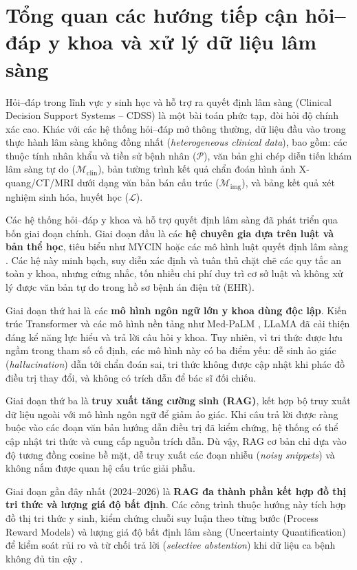 \section{Tổng quan các hướng tiếp cận hỏi--đáp y khoa và xử lý dữ liệu lâm sàng}

Hỏi--đáp trong lĩnh vực y sinh học và hỗ trợ ra quyết định lâm sàng (Clinical Decision Support Systems -- CDSS) là một bài toán phức tạp, đòi hỏi độ chính xác cao. Khác với các hệ thống hỏi--đáp mở thông thường, dữ liệu đầu vào trong thực hành lâm sàng không đồng nhất (\emph{heterogeneous clinical data}), bao gồm: các thuộc tính nhân khẩu và tiền sử bệnh nhân ($\mathcal{P}$), văn bản ghi chép diễn tiến khám lâm sàng tự do ($\mathcal{M}_{\mathrm{clin}}$), bản tường trình kết quả chẩn đoán hình ảnh X-quang/CT/MRI dưới dạng văn bản bán cấu trúc ($\mathcal{M}_{\mathrm{img}}$), và bảng kết quả xét nghiệm sinh hóa, huyết học ($\mathcal{L}$).

Các hệ thống hỏi--đáp y khoa và hỗ trợ quyết định lâm sàng đã phát triển qua bốn giai đoạn chính. Giai đoạn đầu là các \textbf{hệ chuyên gia dựa trên luật và bản thể học}, tiêu biểu như MYCIN hoặc các mô hình luật quyết định lâm sàng \cite{rule_based_1, rule_based_2}. Các hệ này minh bạch, suy diễn xác định và tuân thủ chặt chẽ các quy tắc an toàn y khoa, nhưng cứng nhắc, tốn nhiều chi phí duy trì cơ sở luật và không xử lý được văn bản tự do trong hồ sơ bệnh án điện tử (EHR).

Giai đoạn thứ hai là các \textbf{mô hình ngôn ngữ lớn y khoa dùng độc lập}. Kiến trúc Transformer \cite{vaswani2017} và các mô hình nền tảng như Med-PaLM \cite{singhal2023towards}, LLaMA \cite{llama3_2024} đã cải thiện đáng kể năng lực hiểu và trả lời câu hỏi y khoa. Tuy nhiên, vì tri thức được lưu ngầm trong tham số cố định, các mô hình này có ba điểm yếu: dễ sinh ảo giác (\emph{hallucination}) dẫn tới chẩn đoán sai, tri thức không được cập nhật khi phác đồ điều trị thay đổi, và không có trích dẫn để bác sĩ đối chiếu.

Giai đoạn thứ ba là \textbf{truy xuất tăng cường sinh (RAG)}, kết hợp bộ truy xuất dữ liệu ngoài với mô hình ngôn ngữ \cite{lewis2020, karpukhin2020} để giảm ảo giác. Khi câu trả lời được ràng buộc vào các đoạn văn bản hướng dẫn điều trị đã kiểm chứng, hệ thống có thể cập nhật tri thức và cung cấp nguồn trích dẫn. Dù vậy, RAG cơ bản chỉ dựa vào độ tương đồng cosine bề mặt, dễ truy xuất các đoạn nhiễu (\emph{noisy snippets}) và không nắm được quan hệ cấu trúc giải phẫu.

Giai đoạn gần đây nhất (2024--2026) là \textbf{RAG đa thành phần kết hợp đồ thị tri thức và lượng giá độ bất định}. Các công trình thuộc hướng này tích hợp đồ thị tri thức y sinh, kiểm chứng chuỗi suy luận theo từng bước (Process Reward Models) và lượng giá độ bất định lâm sàng (Uncertainty Quantification) để kiểm soát rủi ro và từ chối trả lời (\emph{selective abstention}) khi dữ liệu ca bệnh không đủ tin cậy \cite{knowing_when_abstain_2026, knowguard2024, dong2025discuss}.

